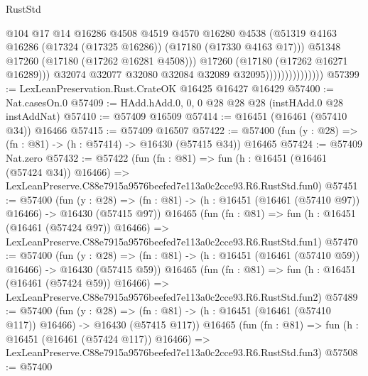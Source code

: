 \begin{lexlean}{RustStd}
\begin{coremodule}
                                      @104
                                      @17
                                      @14
                                      @16286
                                      @4508
                                      @4519
                                      @4570
                                      @16280
                                      @4538
                                      (@51319
                                        @4163
                                        @16286
                                        (@17324 (@17325 @16286))
                                        (@17180 (@17330 @4163 @17)))
                                      @51348
                                      @17260
                                      (@17180 (@17262 @16281 @4508)))
                                    @17260
                                    (@17180 (@17262 @16271 @16289)))
                                  @32074
                                  @32077
                                  @32080
                                  @32084
                                  @32089
                                  @32095)))))))))))))))
@57399 := LexLeanPreservation.Rust.CrateOK @16425 @16427 @16429
@57400 := Nat.casesOn.{0}
@57409 := HAdd.hAdd.{0, 0, 0} @28 @28 @28 (instHAdd.{0} @28 instAddNat)
@57410 := @57409 @16509
@57414 := @16451 (@16461 (@57410 @34)) @16466
@57415 := @57409 @16507
@57422 := @57400 (fun (y : @28) => (fn : @81) -> (h : @57414) -> @16430 (@57415 @34)) @16465
@57424 := @57409 Nat.zero
@57432 := @57422
    (fun (fn : @81) =>
    fun (h : @16451 (@16461 (@57424 @34)) @16466) =>
    LexLeanPreserve.C88e7915a9576beefed7e113a0c2cce93.R6.RustStd.fun0)
@57451 := @57400
    (fun (y : @28) =>
    (fn : @81) -> (h : @16451 (@16461 (@57410 @97)) @16466) -> @16430 (@57415 @97))
    @16465
    (fun (fn : @81) =>
    fun (h : @16451 (@16461 (@57424 @97)) @16466) =>
    LexLeanPreserve.C88e7915a9576beefed7e113a0c2cce93.R6.RustStd.fun1)
@57470 := @57400
    (fun (y : @28) =>
    (fn : @81) -> (h : @16451 (@16461 (@57410 @59)) @16466) -> @16430 (@57415 @59))
    @16465
    (fun (fn : @81) =>
    fun (h : @16451 (@16461 (@57424 @59)) @16466) =>
    LexLeanPreserve.C88e7915a9576beefed7e113a0c2cce93.R6.RustStd.fun2)
@57489 := @57400
    (fun (y : @28) =>
    (fn : @81) -> (h : @16451 (@16461 (@57410 @117)) @16466) -> @16430 (@57415 @117))
    @16465
    (fun (fn : @81) =>
    fun (h : @16451 (@16461 (@57424 @117)) @16466) =>
    LexLeanPreserve.C88e7915a9576beefed7e113a0c2cce93.R6.RustStd.fun3)
@57508 := @57400

\end{coremodule}
\end{lexlean}
